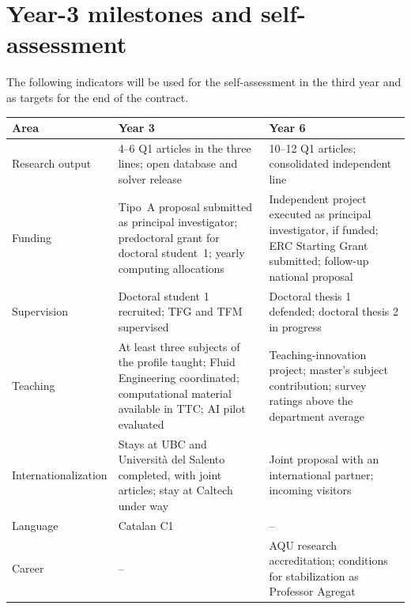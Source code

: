 \documentclass[11pt]{article}
\begin{document}
\section{Year-3 milestones and self-assessment}
The following indicators will be used for the self-assessment in the third year and as
targets for the end of the contract.
\begin{center}\small
\begin{tabularx}{\textwidth}{@{}p{3.0cm}XX@{}}
\toprule
\textbf{Area} & \textbf{Year 3} & \textbf{Year 6} \\
\midrule
Research output & 4--6 Q1 articles in the three lines; open database and solver release & 10--12 Q1 articles; consolidated independent line \\
Funding & Tipo~A proposal submitted as principal investigator; predoctoral grant for doctoral student~1; yearly computing allocations & Independent project executed as principal investigator, if funded; ERC Starting Grant submitted; follow-up national proposal \\
Supervision & Doctoral student 1 recruited; TFG and TFM supervised & Doctoral thesis 1 defended; doctoral thesis 2 in progress \\
Teaching & At least three subjects of the profile taught; Fluid Engineering coordinated; computational material available in TTC; AI pilot evaluated & Teaching-innovation project; master's subject contribution; survey ratings above the department average \\
Internationalization & Stays at UBC and Universit\`a del Salento completed, with joint articles; stay at Caltech under way & Joint proposal with an international partner; incoming visitors \\
Language & Catalan C1 & -- \\
Career & -- & AQU research accreditation; conditions for stabilization as Professor Agregat \\
\bottomrule
\end{tabularx}
\end{center}
\end{document}

